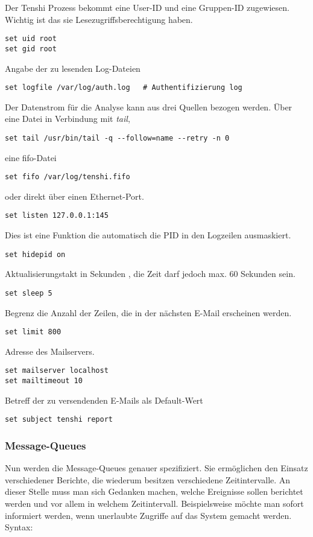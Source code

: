 Der Tenshi Prozess bekommt eine User-ID und eine Gruppen-ID zugewiesen. Wichtig ist das sie Lesezugriffsberechtigung haben.
\begin{lstlisting}
set uid root
set gid root
\end{lstlisting}
Angabe der zu lesenden Log-Dateien
\begin{lstlisting}
set logfile /var/log/auth.log	# Authentifizierung log
\end{lstlisting}
Der Datenstrom für die Analyse kann aus drei Quellen bezogen werden. 
Über eine Datei in Verbindung mit \textit{tail},
\begin{lstlisting}
set tail /usr/bin/tail -q --follow=name --retry -n 0 
\end{lstlisting}
eine fifo-Datei
\begin{lstlisting}
set fifo /var/log/tenshi.fifo		
\end{lstlisting}
oder direkt über einen Ethernet-Port.	
\begin{lstlisting}
set listen 127.0.0.1:145
\end{lstlisting}
Dies ist eine Funktion die automatisch die PID in den Logzeilen  ausmaskiert.
\begin{lstlisting}
set hidepid on
\end{lstlisting}
Aktualisierungstakt in Sekunden , die Zeit darf jedoch max. 60 Sekunden sein.
\begin{lstlisting}
set sleep 5	
\end{lstlisting}
Begrenz die Anzahl der Zeilen, die in der nächsten E-Mail erscheinen werden.
\begin{lstlisting} 
set limit 800
\end{lstlisting}

Adresse des Mailservers.
\begin{lstlisting} 
set mailserver localhost
set mailtimeout 10
\end{lstlisting}

Betreff der zu versendenden E-Mails als Default-Wert
\begin{lstlisting} 
set subject tenshi report
\end{lstlisting}


\subsubsection{Message-Queues}
Nun werden die Message-Queues genauer spezifiziert. Sie ermöglichen den Einsatz verschiedener Berichte, die wiederum besitzen verschiedene Zeitintervalle. An dieser Stelle muss man sich Gedanken machen, welche Ereignisse sollen berichtet werden und vor allem in welchem Zeitintervall. Beispielsweise möchte man sofort informiert werden, wenn unerlaubte Zugriffe auf das System gemacht werden. 
Syntax:

